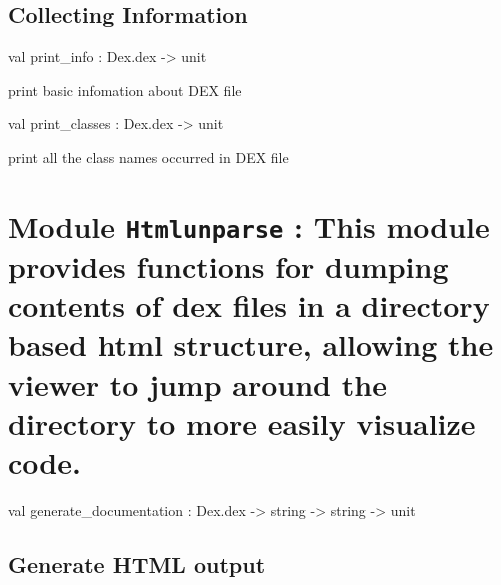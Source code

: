 \documentclass[11pt]{article}
\begin{document}
\subsection{Collecting Information}




\label{val:Unparse.print-underscoreinfo}\begin{ocamldoccode}
val print_info : Dex.dex -> unit
\end{ocamldoccode}
\begin{ocamldocdescription}
print basic infomation about DEX file


\end{ocamldocdescription}




\label{val:Unparse.print-underscoreclasses}\begin{ocamldoccode}
val print_classes : Dex.dex -> unit
\end{ocamldoccode}
\begin{ocamldocdescription}
print all the class names occurred in DEX file


\end{ocamldocdescription}


\section{Module {\tt{Htmlunparse}} : This module provides functions for dumping contents of dex files in 
    a directory based html structure, allowing the viewer to jump around 
    the directory to more easily visualize code.}
\label{module:Htmlunparse}




\ocamldocvspace{0.5cm}



\label{val:Htmlunparse.generate-underscoredocumentation}\begin{ocamldoccode}
val generate_documentation : Dex.dex -> string -> string -> unit
\end{ocamldoccode}
\begin{ocamldocdescription}
\subsection{Generate HTML output}



\end{ocamldocdescription}
\end{document}
